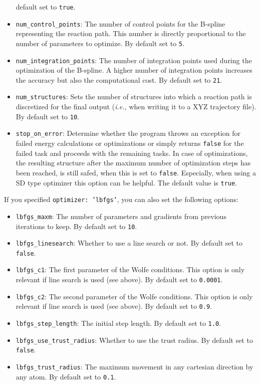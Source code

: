 \documentclass[]{tufte-book}
\begin{document}
\begin{itemize}
default set to \texttt{true}.
\item \texttt{num\_control\_points}: The number of control points for the B-spline representing the reaction path. This number
is directly proportional to the number of parameters to optimize. By default set to \texttt{5}.
\item \texttt{num\_integration\_points}: The number of integration points used during the optimization of the B-spline.
A higher number of integration points increases the accuracy but also the computational cost. By default set to \texttt{21}.
\item \texttt{num\_structures}: Sets the number of structures into which a reaction path is discretized for the final
output (\textit{i.e.,} when writing it to a XYZ trajectory file). By default set to \texttt{10}.
\item \texttt{stop\_on\_error}: Determine whether the program throws an exception for failed energy calculations or optimizations or simply returns \texttt{false} for the failed task and proceeds with the remaining tasks. In case of optimizations, the resulting structure after the maximum number of optimization steps has been reached, is still safed, when this is set to \texttt{false}. Especially, when using a SD type optimizer this option can be helpful. The default value is \texttt{true}.
\end{itemize}

If you specified \texttt{optimizer: 'lbfgs'}, you can also set the following options:
\begin{itemize}
\item \texttt{lbfgs\_maxm}: The number of parameters and gradients from previous iterations to keep. By default set to
\texttt{10}.
\item \texttt{lbfgs\_linesearch}: Whether to use a line search or not. By default set to \texttt{false}.
\item \texttt{lbfgs\_c1}: The first parameter of the Wolfe conditions. This option is only relevant if line search is
used (see above). By default set to \texttt{0.0001}.
\item \texttt{lbfgs\_c2}:  The second parameter of the Wolfe conditions. This option is only relevant if line search is
used (see above). By default set to \texttt{0.9}.
\item \texttt{lbfgs\_step\_length}: The initial step length. By default set to \texttt{1.0}.
\item \texttt{lbfgs\_use\_trust\_radius}: Whether to use the trust radius. By default set to \texttt{false}.
\item \texttt{lbfgs\_trust\_radius}: The maximum movement in any cartesian direction by any atom. By default set to \texttt{0.1}.
\end{itemize}
\end{document}
